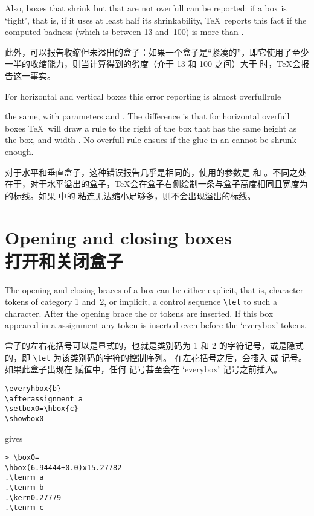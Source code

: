 Also, boxes that shrink but that are not overfull can be reported:
if a box is `tight', that is, if it uses at least half its
shrinkability, \TeX\ reports this fact if the
computed badness (which is between 13 and~100) is more than
.

此外，可以报告收缩但未溢出的盒子：如果一个盒子是“紧凑的”，即它使用了至少一半的收缩能力，则当计算得到的劣度（介于 13 和 100 之间）大于  时，\TeX 会报告这一事实。


For horizontal and vertical boxes this error reporting is almost
\cstoidx overfullrule\par
the same, with parameters  and .
The difference is that for horizontal overfull boxes
\TeX\ will draw a rule to the right of the box that has the
same height as the box, and width .
No overfull rule ensues if 
the  glue in an  cannot be
shrunk enough.

对于水平和垂直盒子，这种错误报告几乎是相同的，使用的参数是  和 。不同之处在于，对于水平溢出的盒子，\TeX 会在盒子右侧绘制一条与盒子高度相同且宽度为  的标线。如果  中的  粘连无法缩小足够多，则不会出现溢出的标线。


\section{Opening and closing boxes\\打开和关闭盒子}

The opening and closing braces of a box can be either explicit,
that is, character tokens of category 1 and~2, or implicit,
a control sequence \verb=\let= to such a character.
After the opening brace 
the  or 
tokens are inserted.
If this box appeared in a  assignment
any 
token is inserted even before the `everybox' tokens.

盒子的左右花括号可以是显式的，也就是类别码为 1 和 2 的字符记号，或是隐式的，即 \verb=\let= 为该类别码的字符的控制序列。
在左花括号之后，会插入  或  记号。
如果此盒子出现在  赋值中，任何  记号甚至会在 `everybox' 记号之前插入。

\begin{example} \label{every:box:assign}\begin{verbatim}
\everyhbox{b}
\afterassignment a
\setbox0=\hbox{c}
\showbox0
\end{verbatim}
gives
\begin{verbatim}
> \box0=
\hbox(6.94444+0.0)x15.27782
.\tenrm a
.\tenrm b
.\kern0.27779
.\tenrm c
\end{verbatim}
\end{example}

